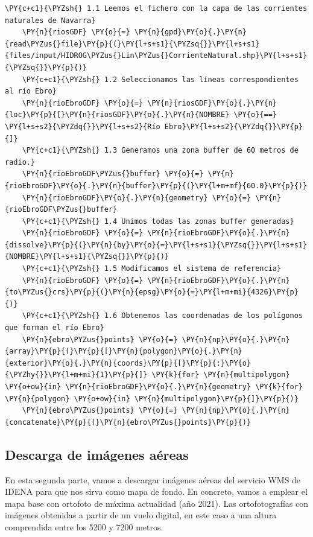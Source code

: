 \begin{tcolorbox}[breakable, size=fbox, boxrule=1pt, pad at break*=1mm,colback=cellbackground, colframe=cellborder, fontupper=\footnotesize]
    \begin{Verbatim}[commandchars=\\\{\}]
    \PY{c+c1}{\PYZsh{} 1.1 Leemos el fichero con la capa de las corrientes naturales de Navarra}
    \PY{n}{riosGDF} \PY{o}{=} \PY{n}{gpd}\PY{o}{.}\PY{n}{read\PYZus{}file}\PY{p}{(}\PY{l+s+s1}{\PYZsq{}}\PY{l+s+s1}{files/input/HIDROG\PYZus{}Lin\PYZus{}CorrienteNatural.shp}\PY{l+s+s1}{\PYZsq{}}\PY{p}{)} 
    \PY{c+c1}{\PYZsh{} 1.2 Seleccionamos las líneas correspondientes al río Ebro}
    \PY{n}{rioEbroGDF} \PY{o}{=} \PY{n}{riosGDF}\PY{o}{.}\PY{n}{loc}\PY{p}{[}\PY{n}{riosGDF}\PY{o}{.}\PY{n}{NOMBRE} \PY{o}{==} \PY{l+s+s2}{\PYZdq{}}\PY{l+s+s2}{Río Ebro}\PY{l+s+s2}{\PYZdq{}}\PY{p}{]}
    \PY{c+c1}{\PYZsh{} 1.3 Generamos una zona buffer de 60 metros de radio.}
    \PY{n}{rioEbroGDF\PYZus{}buffer} \PY{o}{=} \PY{n}{rioEbroGDF}\PY{o}{.}\PY{n}{buffer}\PY{p}{(}\PY{l+m+mf}{60.0}\PY{p}{)}
    \PY{n}{rioEbroGDF}\PY{o}{.}\PY{n}{geometry} \PY{o}{=} \PY{n}{rioEbroGDF\PYZus{}buffer}
    \PY{c+c1}{\PYZsh{} 1.4 Unimos todas las zonas buffer generadas}
    \PY{n}{rioEbroGDF} \PY{o}{=} \PY{n}{rioEbroGDF}\PY{o}{.}\PY{n}{dissolve}\PY{p}{(}\PY{n}{by}\PY{o}{=}\PY{l+s+s1}{\PYZsq{}}\PY{l+s+s1}{NOMBRE}\PY{l+s+s1}{\PYZsq{}}\PY{p}{)}
    \PY{c+c1}{\PYZsh{} 1.5 Modificamos el sistema de referencia}
    \PY{n}{rioEbroGDF} \PY{o}{=} \PY{n}{rioEbroGDF}\PY{o}{.}\PY{n}{to\PYZus{}crs}\PY{p}{(}\PY{n}{epsg}\PY{o}{=}\PY{l+m+mi}{4326}\PY{p}{)}
    \PY{c+c1}{\PYZsh{} 1.6 Obtenemos las coordenadas de los polígonos que forman el río Ebro}
    \PY{n}{ebro\PYZus{}points} \PY{o}{=} \PY{n}{np}\PY{o}{.}\PY{n}{array}\PY{p}{(}\PY{p}{[}\PY{n}{polygon}\PY{o}{.}\PY{n}{exterior}\PY{o}{.}\PY{n}{coords}\PY{p}{[}\PY{p}{:}\PY{o}{\PYZhy{}}\PY{l+m+mi}{1}\PY{p}{]} \PY{k}{for} \PY{n}{multipolygon} \PY{o+ow}{in} \PY{n}{rioEbroGDF}\PY{o}{.}\PY{n}{geometry} \PY{k}{for} \PY{n}{polygon} \PY{o+ow}{in} \PY{n}{multipolygon}\PY{p}{]}\PY{p}{)}
    \PY{n}{ebro\PYZus{}points} \PY{o}{=} \PY{n}{np}\PY{o}{.}\PY{n}{concatenate}\PY{p}{(}\PY{n}{ebro\PYZus{}points}\PY{p}{)}
    \end{Verbatim}
\end{tcolorbox}
\newpage
\subsection{Descarga de imágenes aéreas}
En esta segunda parte, vamos a descargar imágenes aéreas del servicio WMS de IDENA para que nos sirva como mapa de fondo.
En concreto, vamos a emplear el mapa base con ortofoto de máxima actualidad (año 2021). 
Las ortofotografías con imágenes obtenidas a partir de un vuelo digital, en este caso a una altura comprendida entre los 5200 y 7200 metros. 

